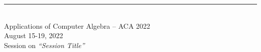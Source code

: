 \documentclass{article}
\newcommand{\HEADING}{
{\noindent \small Applications of Computer Algebra -- ACA 2022 \\
\small August 15-19, 2022\\
Session on \textit{``Session Title''}}
\vspace{10pt}}
\begin{document}
	
\rule{\textwidth}{0.01 in}\\[-2em]
	
\HEADING	

\vspace{1cm}




\end{document}
